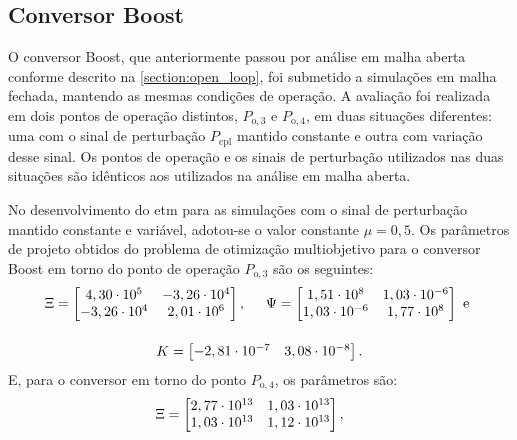 \subsection{Conversor Boost}

O conversor Boost, que anteriormente passou por análise em malha aberta conforme descrito na \autoref{section:open_loop}, foi submetido a simulações em malha fechada, mantendo as mesmas condições de operação. A avaliação foi realizada em dois pontos de operação distintos, $P_{\mathrm{o}, 3}$ e $P_{\mathrm{o}, 4}$, em duas situações diferentes: uma com o sinal de perturbação $P_{\mathrm{cpl}}$ mantido constante e outra com variação desse sinal. Os pontos de operação e os sinais de perturbação utilizados nas duas situações são idênticos aos utilizados na análise em malha aberta.

No desenvolvimento do \acrshort{etm} para as simulações com o sinal de perturbação mantido constante e variável, adotou-se o valor constante $\mu = 0,5$. Os parâmetros de projeto obtidos do problema de otimização multiobjetivo para o conversor Boost em torno do ponto de operação $P_{\mathrm{o}, 3}$ são os seguintes: \begin{gather}
  \Xi = \begin{bmatrix}
    4,30 \cdot 10^5  & -3,26 \cdot 10^4 \\
    -3,26 \cdot 10^4 & 2,01 \cdot 10^6  \\
  \end{bmatrix}, \hspace{.5cm}
  \Psi = \begin{bmatrix}
    1,51 \cdot 10^8    & 1,03 \cdot 10^{-6} \\
    1,03 \cdot 10^{-6} & 1,77 \cdot 10^8    \\
  \end{bmatrix} \text{ e } \notag \\[12pt]
  K = \begin{bmatrix}
    -2,81 \cdot 10^{-7} & 3,08 \cdot 10^{-8}
  \end{bmatrix} . \notag
\end{gather} E, para o conversor em torno do ponto $P_{\mathrm{o}, 4}$, os parâmetros são: \begin{gather}
  \Xi = \begin{bmatrix}
    2,77\cdot 10^{13} & 1,03\cdot 10^{13} \\
    1,03\cdot 10^{13} & 1,12\cdot 10^{13} \\
  \end{bmatrix}, \hspace{.5cm}

\end{gather}
